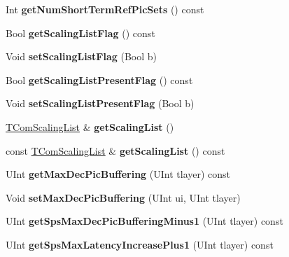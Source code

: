 \begin{DoxyCompactItemize}
Int {\bfseries get\+Num\+Short\+Term\+Ref\+Pic\+Sets} () const
\item 
\mbox{\label{class_t_com_s_p_s_aafb363356be360f777bb2d12577ea837}} 
Bool {\bfseries get\+Scaling\+List\+Flag} () const
\item 
\mbox{\label{class_t_com_s_p_s_a612bf167ea7a974eae1c3b782d51df3f}} 
Void {\bfseries set\+Scaling\+List\+Flag} (Bool b)
\item 
\mbox{\label{class_t_com_s_p_s_a7ef2624c4be854aef86cd101a96a610a}} 
Bool {\bfseries get\+Scaling\+List\+Present\+Flag} () const
\item 
\mbox{\label{class_t_com_s_p_s_ab34e0b1d667d2914c8bc9f44a47dd4f2}} 
Void {\bfseries set\+Scaling\+List\+Present\+Flag} (Bool b)
\item 
\mbox{\label{class_t_com_s_p_s_a0c515b2d143eff3ad18ada215b332482}} 
\hyperlink{class_t_com_scaling_list}{T\+Com\+Scaling\+List} \& {\bfseries get\+Scaling\+List} ()
\item 
\mbox{\label{class_t_com_s_p_s_ad1b6ae94a8a0ff0f1cd7cd7cf1451798}} 
const \hyperlink{class_t_com_scaling_list}{T\+Com\+Scaling\+List} \& {\bfseries get\+Scaling\+List} () const
\item 
\mbox{\label{class_t_com_s_p_s_a2c3352bdf4b9980998c94fcf5dfc73e5}} 
U\+Int {\bfseries get\+Max\+Dec\+Pic\+Buffering} (U\+Int tlayer) const
\item 
\mbox{\label{class_t_com_s_p_s_a7510d5d833889bb82a4f387f74701db5}} 
Void {\bfseries set\+Max\+Dec\+Pic\+Buffering} (U\+Int ui, U\+Int tlayer)
\item 
\mbox{\label{class_t_com_s_p_s_ae036a27faaa68185aff82ab7a8c82197}} 
U\+Int {\bfseries get\+Sps\+Max\+Dec\+Pic\+Buffering\+Minus1} (U\+Int tlayer) const
\item 
\mbox{\label{class_t_com_s_p_s_a59de4db5517bbd6589f5d3c5cc649c0f}} 
U\+Int {\bfseries get\+Sps\+Max\+Latency\+Increase\+Plus1} (U\+Int tlayer) const

\end{DoxyCompactItemize}
